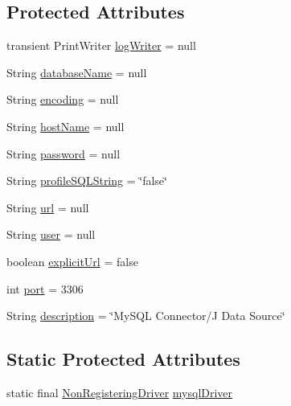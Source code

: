 \subsection*{Protected Attributes}
\begin{DoxyCompactItemize}
\item 
transient Print\+Writer \mbox{\hyperlink{classcom_1_1mysql_1_1cj_1_1jdbc_1_1_mysql_data_source_aed97ebeccb42b70af74e694fd9b2fc6b}{log\+Writer}} = null
\item 
String \mbox{\hyperlink{classcom_1_1mysql_1_1cj_1_1jdbc_1_1_mysql_data_source_a033e1f8834e4452b6875af6824350566}{database\+Name}} = null
\item 
String \mbox{\hyperlink{classcom_1_1mysql_1_1cj_1_1jdbc_1_1_mysql_data_source_abc5d2e11dc386165230580da367fbfc3}{encoding}} = null
\item 
String \mbox{\hyperlink{classcom_1_1mysql_1_1cj_1_1jdbc_1_1_mysql_data_source_af9a0b6519762e254224dd6573db12226}{host\+Name}} = null
\item 
String \mbox{\hyperlink{classcom_1_1mysql_1_1cj_1_1jdbc_1_1_mysql_data_source_a4fa203c75e6a5ecc3671e86c42ce95f5}{password}} = null
\item 
String \mbox{\hyperlink{classcom_1_1mysql_1_1cj_1_1jdbc_1_1_mysql_data_source_aef3ae80bdc336a91cfe4e03bd9046384}{profile\+S\+Q\+L\+String}} = \char`\"{}false\char`\"{}
\item 
String \mbox{\hyperlink{classcom_1_1mysql_1_1cj_1_1jdbc_1_1_mysql_data_source_a3e7b4dc2d4ae64f960ee5970a60112b3}{url}} = null
\item 
String \mbox{\hyperlink{classcom_1_1mysql_1_1cj_1_1jdbc_1_1_mysql_data_source_ac4bb1de22b71046ca05c46ec7b2769b9}{user}} = null
\item 
boolean \mbox{\hyperlink{classcom_1_1mysql_1_1cj_1_1jdbc_1_1_mysql_data_source_a05519771d81bbe9ab579496d40d5e124}{explicit\+Url}} = false
\item 
int \mbox{\hyperlink{classcom_1_1mysql_1_1cj_1_1jdbc_1_1_mysql_data_source_a1a2c2456d00300c3d2adcca6b909fd2e}{port}} = 3306
\item 
String \mbox{\hyperlink{classcom_1_1mysql_1_1cj_1_1jdbc_1_1_mysql_data_source_ab0a09fe617af72b91e4419eb5d5960b8}{description}} = \char`\"{}My\+S\+QL Connector/J Data Source\char`\"{}
\end{DoxyCompactItemize}
\subsection*{Static Protected Attributes}
\begin{DoxyCompactItemize}
\item 
static final \mbox{\hyperlink{classcom_1_1mysql_1_1cj_1_1jdbc_1_1_non_registering_driver}{Non\+Registering\+Driver}} \mbox{\hyperlink{classcom_1_1mysql_1_1cj_1_1jdbc_1_1_mysql_data_source_a287608ee7b6fcd286ac73046ca9cca63}{mysql\+Driver}}
\end{DoxyCompactItemize}


